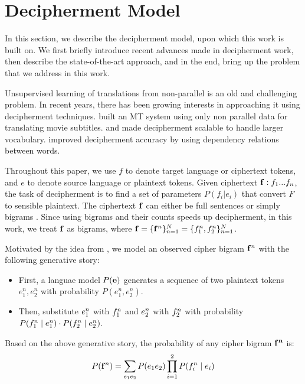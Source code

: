 \section{Decipherment Model}
In this section, we describe the decipherment model, upon which this work is built on. We first briefly introduce recent advances made in decipherment work, then describe the state-of-the-art approach, and in the end, bring up the problem that we address in this work. 

Unsupervised learning of translations from non-parallel is an old and challenging problem. In recent years, there has been growing interests in approaching it using decipherment techniques.  built an MT system using only non parallel data for translating movie subtitles.  and  made decipherment scalable to handle larger vocabulary.  improved decipherment accuracy by using dependency relations between words. 

Throughout this paper, we use $f$ to denote target language or ciphertext tokens, and $e$ to denote source language or plaintext tokens. Given ciphertext $\mathbf{f}:f_{1}...f_{n}$, the task of decipherment is to find a set of parameters $P(f_{i}|e_{i})$ that convert $F$ to sensible plaintext. The ciphertext $\mathbf{f}$ can either be full sentences \cite{ravi-knight:2011,Nuhn:2012} or simply bigrams \cite{dou-knight:2013:EMNLP}. Since using bigrams and their counts speeds up decipherment, in this work, we treat $\mathbf{f}$ as bigrams, where $ \mathbf{f} = \{ \mathbf{f}^n \}_{n=1}^{N} = \{ f_1^n,f_2^n \}_{n=1}^{N} $. 

Motivated by the idea from , we model an observed cipher bigram $\mathbf{f}^n$ with the following generative story:

\begin{itemize}
\item  First, a languae model $P(\mathbf{e})$ generates a sequence of two plaintext tokens $e_{1}^n,e_{2}^n$ with probability $P(e_{1}^n,e_{2}^n)$.
\item  Then, substitute $e_{1}^n$ with $f_{1}^n$ and $e_{2}^n$ with $f_{2}^n$ with probability $P(f_{1}^n \mid e_{1}^n) \cdot P(f_{2}^n \mid e_{2}^n)$.
\end{itemize}

Based on the above generative story, the probability of any cipher bigram $\mathbf{f^n}$ is:
%
\[
\label{p_cipher}
P(\mathbf{f}^n) =  \sum_{e_{1} e_{2}} P(e_{1}e_{2}) \prod_{i=1}^{2}P(f_{i}^n \mid e_{i})
\]
%

